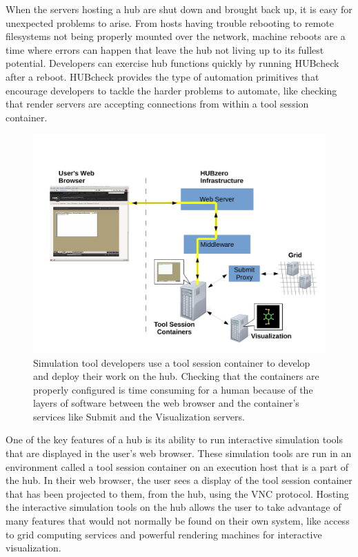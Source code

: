 When the servers hosting a hub are shut down and brought back up, it is easy
for unexpected problems to arise. From hosts having trouble rebooting to remote
filesystems not being properly mounted over the network, machine reboots are a
time where errors can happen that leave the hub not living up to its fullest
potential.  Developers can exercise hub functions quickly by running HUBcheck
after a reboot. HUBcheck provides the type of automation primitives that
encourage developers to tackle the harder problems to automate, like checking
that render servers are accepting connections from within a tool session
container.

\begin{figure}[]
  \centering
  \includegraphics[width=\textwidth]
    {../../images/hubcheck_block_diagram/tool_session_container_block.pdf}
  \caption{ Simulation tool developers use a tool session container to
            develop and deploy their work on the hub. Checking that the
            containers are properly configured is time consuming for a
            human because of the layers of software between the web
            browser and the container's services like Submit and the
            Visualization servers.}
  \label{fig:tool_session_container_block_diagram}
\end{figure}

One of the key features of a hub is its ability to run interactive simulation
tools that are displayed in the user's web browser. These simulation tools are
run in an environment called a tool session container on an execution host that
is a part of the hub. In their web browser, the user sees a display of the tool
session container that has been projected to them, from the hub, using the VNC
protocol. Hosting the interactive simulation tools on the hub allows the user
to take advantage of many features that would not normally be found on their
own system, like access to grid computing services and powerful rendering
machines for interactive visualization.

